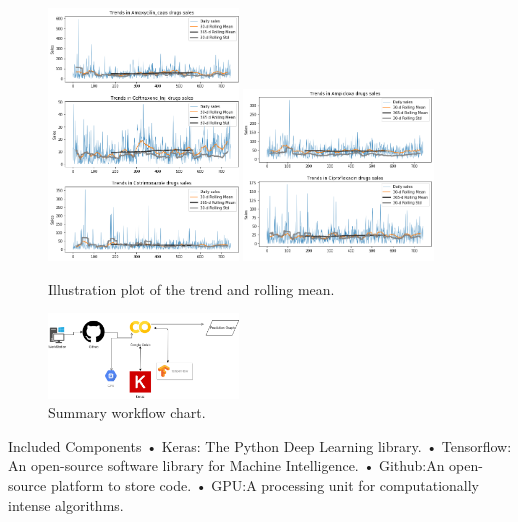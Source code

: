 \documentclass[12pt]{report}
\begin{document}
\begin{figure}[H]%
  \begin {center}
  \includegraphics[width=0.45\textwidth]{images/download (10).png}
  \includegraphics[width=0.45\textwidth]{images/download (12).png}
  \caption{Illustration plot of the trend and rolling mean.}
  \label{fig:ecg}
  \end {center}
\end{figure}


\begin{figure}[H]%
  \begin {center}
  \includegraphics[width=0.45\textwidth]{images/new.png}
  \caption{Summary workflow chart.}
  \label{fig:ecg}
  \end {center}
\end{figure}

Included Components
•	Keras: The Python Deep Learning library.
•	Tensorflow: An open-source software library for Machine Intelligence.
•	Github:An open-source platform to store code.
•	GPU:A processing unit for computationally intense algorithms.
\end{document}
